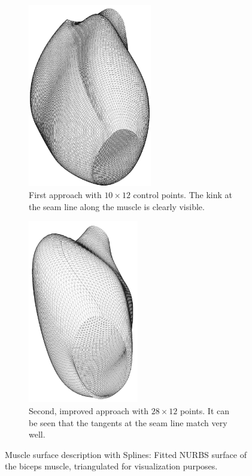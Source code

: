 %
\begin{figure}%
  \centering%
  \begin{subfigure}[t]{0.48\textwidth}%
    \centering%
    \includegraphics[height=8cm]{images/fiber_creation/splines_wrong00.png}%
    \caption{First approach with $10 \times 12$ control points. The kink at the seam line along the muscle is clearly visible.}%
    \label{fig:biceps_splines_wrong}%
  \end{subfigure}
  \quad
  \begin{subfigure}[t]{0.48\textwidth}%
    \centering%
    \includegraphics[height=8cm]{images/fiber_creation/splines_seam00.png}%
    \caption{Second, improved approach with $28 \times 12$ points. It can be seen that the tangents at the seam line match very well.}%
    \label{fig:biceps_splines_seam}%
  \end{subfigure}
  \caption{Muscle surface description with Splines: Fitted NURBS surface of the biceps muscle, triangulated for visualization purposes.}%
  \label{fig:biceps_splines}%
\end{figure}%
%
